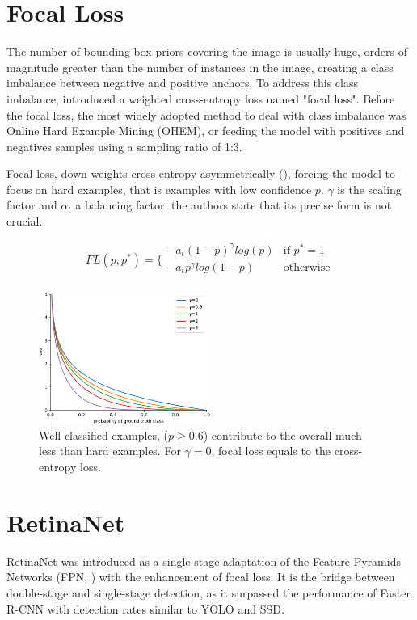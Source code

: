 \section{Focal Loss}
The number of bounding box priors covering the image is usually huge, orders of magnitude greater than the number of instances in the image, creating a class imbalance between negative and positive anchors. To address this class imbalance, \cite{lin2017focal} introduced a weighted cross-entropy loss named "focal loss". Before the focal loss, the most widely adopted method to deal with class imbalance was Online Hard Example Mining (OHEM), or feeding the model with positives and negatives samples using a sampling ratio of 1:3.

Focal loss, down-weights cross-entropy asymmetrically (), forcing the model to focus on hard examples, that is examples with low confidence $p$. $\gamma$ is the scaling factor and $\alpha_t$ a balancing factor; the authors state that its precise form is not crucial.

\begin{equation}
    FL(p,p^*)= \bigg\{
    \begin{array}{ll}
      -a_t(1-p)^\gamma log(p) & \text{if } p^*=1 \\
      -a_tp^\gamma log(1-p) &  \text{otherwise}\\
    \end{array}
\end{equation}

\begin{figure}[!htb]
  \centering
  \includegraphics[width=0.5\textwidth]{figures/ch3/fig3.pdf}
  \caption{Well classified examples, ($p\geq0.6$) contribute to the overall much less than hard examples. For $\gamma=0$, focal loss equals to the cross-entropy loss.}
  \label{ch3:fig3}
\end{figure} 

\section{RetinaNet}
RetinaNet was introduced as a single-stage adaptation of the Feature Pyramids Networks (FPN, \cite{lin2017feature}) with the enhancement of focal loss. It is the bridge between double-stage and single-stage detection, as it surpassed the performance of Faster R-CNN with detection rates similar to YOLO and SSD.

